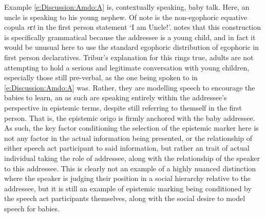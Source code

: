 Example \ref{e:Discussion:Amdo:A} is, contextually speaking, baby talk. Here, an uncle is speaking to his young nephew. Of note is the non-egophoric equative copula \textit{rɛt} in the first person statement `I am Uncle!'.  notes that this construction is specifically grammatical because the addressee is a young child, and in fact it would be unusual here to use the standard egophoric distribution of egophoric in first person declaratives. Tribur's explanation for this rings true, adults are not attempting to hold a serious and legitimate conversation with young children, especially those still pre-verbal, as the one being spoken to in \ref{e:Discussion:Amdo:A} was. Rather, they are modelling speech to encourage the babies to learn, an as such are speaking entirely within the addressee's perspective in epistemic terms, despite still referring to themself in the first person. That is, the epistemic origo is firmly anchored with the baby addressee. As such, the key factor conditioning the selection of the epistemic marker here is not any factor in the actual information being presented, or the relationship of either speech act participant to said information, but rather an trait of actual individual taking the role of addressee, along with the relationship of the speaker to this addressee. This is clearly not an example of a highly nuanced distinction where the speaker is judging their position in a social hierarchy relative to the addressee, but it is still an example of epistemic marking being conditioned by the speech act participants themselves, along with the social desire to model speech for babies.

